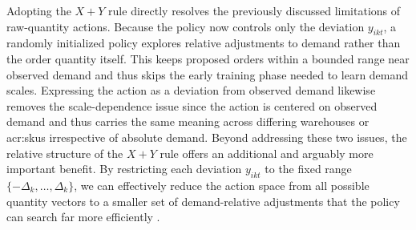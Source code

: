 Adopting the $X+Y$ rule directly resolves the previously discussed limitations of raw-quantity actions. Because the policy now controls only the deviation $y_{ikt}$, a randomly initialized policy explores relative adjustments to demand rather than the order quantity itself. This keeps proposed orders within a bounded range near observed demand and thus skips the early training phase needed to learn demand scales. Expressing the action as a deviation from observed demand likewise removes the scale-dependence issue since the action is centered on observed demand and thus carries the same meaning across differing warehouses or \glspl{acr:sku} irrespective of absolute demand. Beyond addressing these two issues, the relative structure of the $X+Y$ rule offers an additional and arguably more important benefit. By restricting each deviation $y_{ikt}$ to the fixed range $\{-\Delta_k,\dots,\Delta_k\}$, we can effectively reduce the action space from all possible quantity vectors to a smaller set of demand-relative adjustments that the policy can search far more efficiently \citep{Preil2021}.

